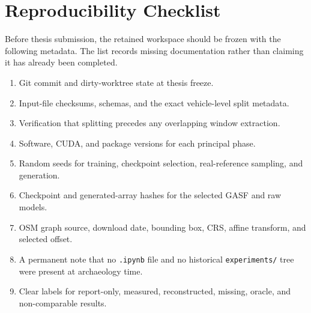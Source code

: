 \documentclass[12pt,a4paper,oneside]{report}
\begin{document}
\chapter{Reproducibility Checklist}
\label{app:reproducibility}

Before thesis submission, the retained workspace should be frozen with the following metadata. The list records missing documentation rather than claiming it has already been completed.

\begin{enumerate}
  \item Git commit and dirty-worktree state at thesis freeze.
  \item Input-file checksums, schemas, and the exact vehicle-level split metadata.
  \item Verification that splitting precedes any overlapping window extraction.
  \item Software, CUDA, and package versions for each principal phase.
  \item Random seeds for training, checkpoint selection, real-reference sampling, and generation.
  \item Checkpoint and generated-array hashes for the selected GASF and raw models.
  \item OSM graph source, download date, bounding box, CRS, affine transform, and selected offset.
  \item A permanent note that no \texttt{.ipynb} file and no historical \texttt{experiments/} tree were present at archaeology time.
  \item Clear labels for report-only, measured, reconstructed, missing, oracle, and non-comparable results.
\end{enumerate}
\end{document}
